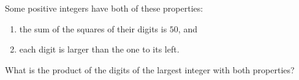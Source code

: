 Some positive integers have both of these properties:
\begin{enumerate}
\item[(i)] the sum of the squares of their digits is $50$, and
\item[(ii)] each digit is larger than the one to its left.
\end{enumerate}
What is the product of the digits of the largest integer with both properties?
